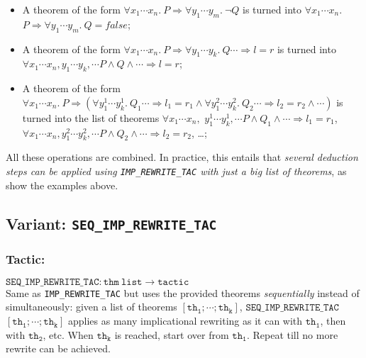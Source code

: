 \documentclass{llncs}
\newcommand*\IMPREWRITETAC{\texttt{IMP\_REWRITE\_TAC}\xspace}
\newcommand*\SEQIMPREWRITETAC{\texttt{SEQ\_IMP\_REWRITE\_TAC}\xspace}
\begin{document}
\begin{itemize}
			\item A theorem of the form $\forall x_1\cdots x_n.\ P \Rightarrow \forall y_1\cdots y_m.\ \neg Q$
				is turned into $\forall x_1\cdots x_n.$ $P \Rightarrow \forall y_1\cdots y_m.\ Q=false$;

      \item A theorem of the form 
        $\forall x_1\cdots x_n.\ P \Rightarrow \forall y_1\cdots y_k.\ Q \cdots \Rightarrow l=r$
        is turned into $\forall x_1\cdots x_n,y_1\cdots y_k,\cdots P \wedge Q \wedge \cdots \Rightarrow l=r$;

      \item A theorem of the form
        $\forall x_1\cdots x_n.\ P \Rightarrow
        (\forall y^1_1\cdots y^1_k.\ Q_1 \cdots \Rightarrow l_1=r_1
        \wedge \forall y^2_1\cdots y^2_k.\ Q_2 \cdots \Rightarrow l_2=r_2
        \wedge \cdots)$ 
        is turned into the list of theorems
        $\forall x_1\cdots x_n,$
        $y^1_1\cdots y^1_k,\cdots P \wedge Q_1 \wedge \cdots \Rightarrow l_1=r_1$,
        $\forall x_1\cdots x_n,y^2_1\cdots y^2_k,\cdots P \wedge Q_2 \wedge \cdots \Rightarrow l_2=r_2$,
        \ldots;
		\end{itemize}
    All these operations are combined. In practice, this entails that \emph{several deduction steps can be
    applied using \IMPREWRITETAC with just a big list of theorems}, as show the examples above.

    \subsection{Variant: \SEQIMPREWRITETAC}

    \subsubsection{Tactic:}
		$\mathtt{\SEQIMPREWRITETAC: thm\ list \to tactic}$\\
    Same as \IMPREWRITETAC but uses the provided theorems \emph{sequentially} instead of simultaneously:
    given a list of theorems $\mathtt{[th_1;\cdots;th_k]}$,
    $\mathtt{\SEQIMPREWRITETAC}$ $\mathtt{[th_1;\cdots;th_k]}$ applies as many implicational rewriting
    as it can with $\mathtt{th_1}$, then with $\mathtt{th_2}$, etc.
		When $\mathtt{th_k}$ is reached, start over from $\mathtt{th_1}$.
		Repeat till no more rewrite can be achieved.
\end{document}
